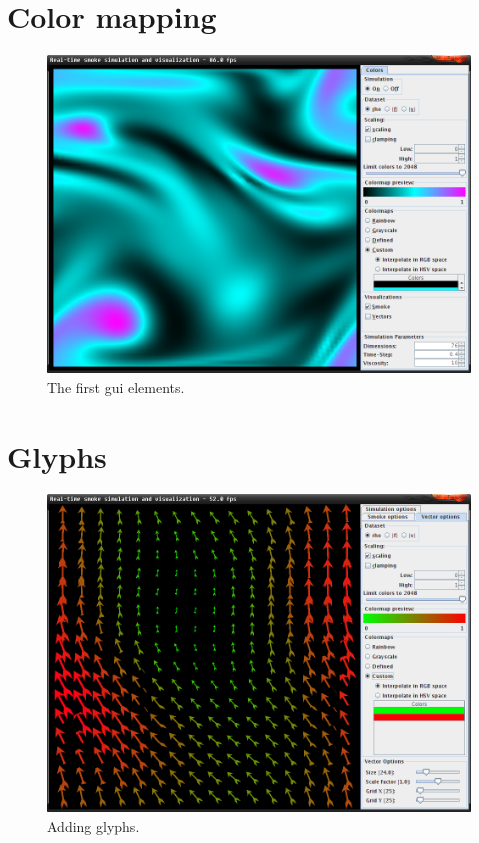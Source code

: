 \documentclass[a4paper,11pt,twoside]{report}
\begin{document}
	\section{Color mapping}
		\begin{figure}[h]
		\centering
		\includegraphics[scale=\imagescalefactor]{images/step2.png}
		\caption{The first gui elements.}\label{fig:step2}
		\end{figure}
		\newpage
	\section{Glyphs}
		\begin{figure}[h]
		\centering
		\includegraphics[scale=\imagescalefactor]{images/step3.png}
		\caption{Adding glyphs.}\label{fig:step3}
		\end{figure}
		\newpage
\end{document}
